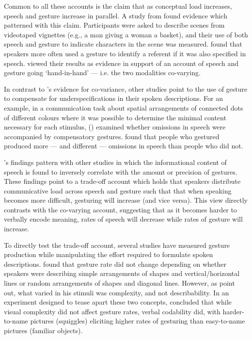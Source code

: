 \documentclass[a4paper,man,natbib]{apa6}
\begin{document}
Common to all these accounts is the claim that as conceptual load increases, speech and gesture increase in parallel.
A \citeyear{So2009} study from \citeauthor{So2009} found evidence which patterned with this claim. 
Participants were asked to describe scenes from videotaped vignettes (e.g., a man giving a woman a basket), and their use of both speech and gesture to indicate characters in the scene was measured.
\citeauthor{So2009} found that speakers more often used a gesture to identify a referent if it was also specified in speech. 
\citeauthor{So2009} viewed their results as evidence in support of an account of speech and gesture going `hand-in-hand' --- i.e. the two modalities co-varying.

In contrast to \citeauthor{So2009}'s evidence for co-variance, other studies point to the use of gesture to compensate for underspecifications in their spoken descriptions.
For an example, in a communication task about spatial arrangements of connected dots of different colours where it was possible to determine the minimal content necessary for each stimulus, \citeauthor{Melinger2004} (\citeyear{Melinger2004}) examined whether omissions in speech were accompanied by compensatory gestures. 
\citeauthor{Melinger2004} found that people who gestured produced more --- and different --- omissions in speech than people who did not. 

\citeauthor{Melinger2004}'s findings pattern with other studies \citep{Bangerter2004, DeRuiter2006, VanderSluis2007} in which the informational content of speech is found to inversely correlate with the amount or precision of gestures. 
These findings point to a trade-off account which holds that speakers distribute communicative load across speech and gesture such that that when speaking becomes more difficult, gesturing will increase (and vice versa). 
This view directly contrasts with the co-varying account, suggesting that as it becomes harder to verbally encode meaning, rates of speech will decrease while rates of gesture will increase. 


To directly test the trade-off account, several studies have measured gesture production while manipulating the effort required to formulate spoken descriptions. 
\citet{DeRuiter1998} found that gesture rate did not change depending on whether speakers were describing simple arrangements of shapes and vertical/horizontal lines or random arrangements of shapes and diagonal lines.
However, as \citet{Morsella2004} point out, what \citeauthor{DeRuiter1998} varied in his stimuli was complexity, and not describability. 
In an experiment designed to tease apart these two concepts, \citet{Morsella2004} concluded that while visual complexity did not affect gesture rates, verbal codability did, with harder-to-name pictures (squiggles) eliciting higher rates of gesturing than easy-to-name pictures (familiar objects).
\end{document}
